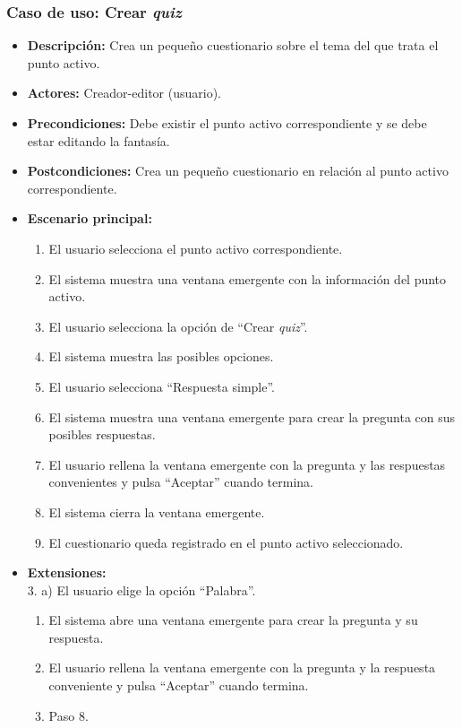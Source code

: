 \subsubsection{Caso de uso: Crear \textit{quiz}}
\begin{itemize}
	\item \textbf{Descripción:} Crea un pequeño cuestionario sobre el tema del que trata el punto activo.
	\item \textbf{Actores:} Creador-editor (usuario).
	\item \textbf{Precondiciones:} Debe existir el punto activo correspondiente y se debe estar editando la fantasía.
	\item \textbf{Postcondiciones:} Crea un pequeño cuestionario en relación al punto activo correspondiente.
	\item \textbf{Escenario principal:}
	\begin{enumerate}
		\item El usuario selecciona el punto activo correspondiente.
		\item El sistema muestra una ventana emergente con la información del punto activo.
		\item El usuario selecciona la opción de ``Crear \textit{quiz}''.
		\item El sistema muestra las posibles opciones.
		\item El usuario selecciona ``Respuesta simple''.
		\item El sistema muestra una ventana emergente para crear la pregunta con sus posibles respuestas.
		\item El usuario rellena la ventana emergente con la pregunta y las respuestas convenientes y pulsa ``Aceptar'' cuando termina.
		\item El sistema cierra la ventana emergente.
		\item El cuestionario queda registrado en el punto activo seleccionado.
	\end{enumerate}
	\item \textbf{Extensiones:} \\3. a) El usuario elige la opción ``Palabra''.
	\begin{enumerate}
		\item El sistema abre una ventana emergente para crear la pregunta y su respuesta.
		\item El usuario rellena la ventana emergente con la pregunta y la respuesta conveniente y pulsa ``Aceptar'' cuando termina.
		\item Paso 8.
	\end{enumerate}

\end{itemize}
